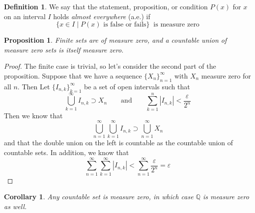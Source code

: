 \documentclass[12pt]{article}
\theoremstyle{plain}
\newtheorem{prop}[thm]{Proposition}
\newtheorem{cor}[thm]{Corollary}
\theoremstyle{definition}
\newtheorem{defn}[thm]{Definition}
\theoremstyle{remark}
\begin{document}
\begin{defn} 
We say that the statement, proposition, or condition $P(x)$ for $x$ on an interval $I$ holds \emph{almost everywhere} (a.e.) if 
\[
    \{ x \in I \; | \; P(x) \text{ is false or fails} \} 
    \;\; \text{is measure zero}
\]
\end{defn}

\begin{prop}
\label{countunion}
Finite sets are of measure zero, and a countable union of measure zero sets is itself measure zero.
\end{prop}
\begin{proof}
The finite case is trivial, so let's consider the second part of the proposition. Suppose that we have a sequence $\{X_n\}_{n=1}^\infty$ with $X_n$ measure zero for all $n$. Then Let $\{I_{n,k}\}_{k=1}^\infty$ be a set of open intervals such that 
    \[
        \bigcup^\infty_{k=1} I_{n,k} \supset X_n 
        \qquad \text{and} \qquad
        \sum^n_{k=1} |I_{n,k}| < \frac{\varepsilon}{2^n}  
    \]
Then we know that 
    \[
        \bigcup^\infty_{n=1}\bigcup^\infty_{k=1} 
        I_{n,k} \supset \bigcup^\infty_{n=1}  X_n 
    \]
and that the double union on the left is countable as the countable union of countable sets. In addition, we know that 
    \[
        \sum^\infty_{n=1}\sum^\infty_{k=1} 
        |I_{n,k}| < \sum^\infty_{n=1} \frac{\varepsilon}{2^n} 
        = \varepsilon
    \]
\end{proof}
\begin{cor}
Any countable set is measure zero, in which case $\mathbb{Q}$ is measure zero as well.
\end{cor}
\end{document}
